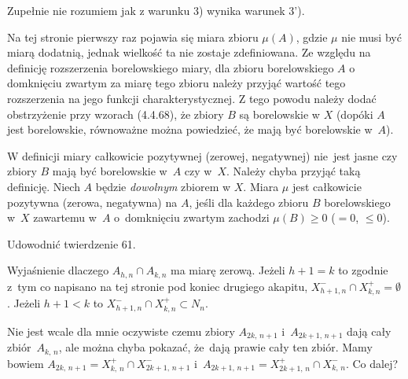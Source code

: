 \documentclass[a4paper,11pt]{article}
\numberwithin{equation}{section}
\begin{document}
\VerSpaceFour



\noindent {} Zupełnie nie rozumiem jak z warunku 3) wynika warunek
3').

\VerSpaceFour





\noindent
{} Na tej stronie pierwszy raz pojawia się miara zbioru
$\mu( A )$, gdzie $\mu$ nie musi być miarą dodatnią, jednak wielkość
ta nie zostaje zdefiniowana. Ze względu na definicję rozszerzenia
borelowskiego miary, dla zbioru borelowskiego $A$ o domknięciu zwartym
za miarę tego zbioru należy przyjąć wartość tego rozszerzenia na jego
funkcji charakterystycznej. Z tego powodu należy dodać obstrzyżenie
przy wzorach (4.4.68), że zbiory $B$ są borelowskie w $X$ (dopóki $A$
jest borelowskie, równoważne można powiedzieć, że mają być borelowskie
w~$A$).

\VerSpaceFour





\noindent
{} W definicji miary całkowicie pozytywnej (zerowej,
negatywnej) nie~jest jasne czy zbiory $B$ mają być borelowskie w~$A$
czy w~$X$. Należy chyba przyjąć taką definicję. Niech $A$ będzie
\textit{dowolnym} zbiorem w $X$. Miara $\mu$ jest całkowicie pozytywna
(zerowa, negatywna) na $A$, jeśli dla każdego zbioru $B$ borelowskiego
w~$X$ zawartemu w~$A$ o~domknięciu zwartym zachodzi $\mu( B ) \geq 0$
($= 0$, $\leq 0$).

\VerSpaceFour





\noindent
{} Udowodnić twierdzenie 61.

\VerSpaceFour





\noindent
{} Wyjaśnienie dlaczego $A_{ h, n } \cap A_{ k, n }$ ma
miarę zerową. Jeżeli $h + 1 = k$ to zgodnie z~tym co napisano na tej
stronie pod koniec drugiego akapitu,
$X^{ - }_{ h + 1, n } \cap X^{ + }_{ k, n } = \emptyset$. Jeżeli
$h + 1 < k$ to $X^{ - }_{ h + 1, n } \cap X^{ + }_{ k, n } \subset N_{ n }$.

\VerSpaceFour





\noindent
{} Nie jest wcale dla mnie oczywiste czemu zbiory
$A_{ 2 k,\, n + 1 }$ i~$A_{ 2 k + 1,\, n + 1 }$ dają cały
zbiór~$A_{ k,\, n }$, ale można chyba pokazać, że~dają prawie cały ten
zbiór. Mamy bowiem
$A_{ 2 k,\, n + 1 } = X^{ + }_{ k,\, n }
\cap X^{ - }_{ 2 k + 1,\, n + 1 }$
i~$A_{ 2 k + 1,\, n + 1 } = X^{ + }_{ 2 k + 1,\, n }
\cap X^{ - }_{ k,\, n }$. Co dalej?
\end{document}
